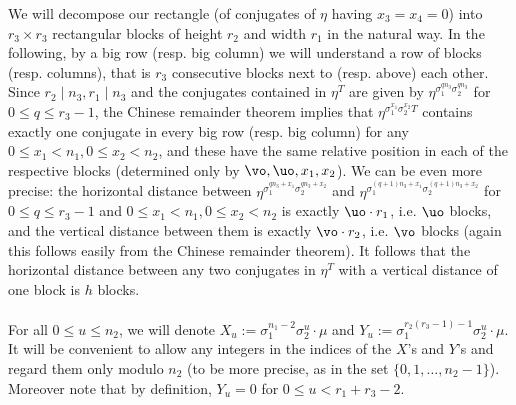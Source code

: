We will decompose our rectangle (of conjugates of $\eta$ having $x_3=x_4=0$) into $r_3\times r_3$ rectangular blocks of height $r_2$ and width $r_1$ in the natural way. In the following, by a big row (resp. big column) we will understand a row of blocks (resp. columns), that is $r_3$ consecutive blocks next to (resp. above) each other. Since $r_2\mid n_3, r_1\mid n_3$ and the conjugates contained in $\eta^T$ are given by $\eta^{\sigma_1^{qn_3}\sigma_2^{qn_3}}$ for $0\leq q \leq r_3-1$, the Chinese remainder theorem implies that $\eta^{\sigma_1^{x_1}\sigma_2^{x_2}T}$ contains exactly one conjugate in every big row (resp. big column) for any $0\leq x_1< n_1, 0\leq x_2< n_2$, and these have the same relative position in each of the respective blocks (determined only by $\vo,\uo,x_1,x_2$). We can be even more precise: the horizontal distance between $\eta^{\sigma_1^{qn_3+x_1}\sigma_2^{qn_3+x_2}}$ and $\eta^ {\sigma_1^{(q+1)n_3+x_1}\sigma_2^{(q+1)n_3+x_2}}$ for $0\leq q \leq r_3-1$ and $0\leq x_1< n_1, 0\leq x_2< n_2$ is exactly $\uo\cdot r_1$, i.e. $\uo$ blocks, and the vertical distance between them is exactly $\vo\cdot r_2$, i.e. $\vo$ blocks (again this follows easily from the Chinese remainder theorem). It follows that the horizontal distance between any two conjugates in $\eta^T$ with a vertical distance of one block is $h$ blocks.

\paragraph*{}
For all $0\leq u\leq n_2$, we will denote $X_u:=\sigma_1^{n_1-2}\sigma_2^{u}\cdot \mu$ and $Y_u:=\sigma_1^{r_2(r_3-1)-1}\sigma_2^u\cdot \mu$. It will be convenient to allow any integers in the indices of the $X$'s and $Y$'s and regard them only modulo $n_2$ (to be more precise, as in the set $\{0,1,\dots,n_2-1\}$). Moreover note that by definition, $Y_u=0$ for $0\leq u< r_1+r_3-2$. 

